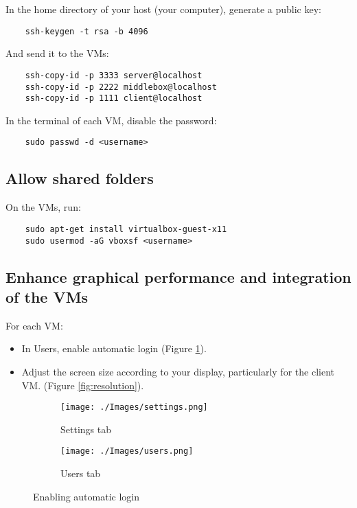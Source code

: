 \documentclass[11pt]{article}
\begin{document}
In the home directory of your host (your computer), generate a public key:
\begin{verbatim}
    ssh-keygen -t rsa -b 4096
\end{verbatim}

And send it to the VMs:
\begin{verbatim}
    ssh-copy-id -p 3333 server@localhost
    ssh-copy-id -p 2222 middlebox@localhost
    ssh-copy-id -p 1111 client@localhost
\end{verbatim}

In the terminal of each VM, disable the password:
\begin{verbatim}
    sudo passwd -d <username>
\end{verbatim}


\subsection{Allow shared folders}
\label{sec:org49c0a3b}

On the VMs, run:
\begin{verbatim}
    sudo apt-get install virtualbox-guest-x11
    sudo usermod -aG vboxsf <username>
\end{verbatim}


\subsection{Enhance graphical performance and integration of the VMs}
\label{sec:org22a38f4}



For each VM:
\begin{itemize}
    \item In Users, enable automatic login (Figure \ref{fig:settings}).
    \item Adjust the screen size according to your display, particularly for the client VM. (Figure \ref{fig:resolution}).
\end{itemize}

\begin{figure}[H]
    \centering
    
    \begin{subfigure}{.4\textwidth}
        \texttt{[image: ./Images/settings.png]}
        \caption{Settings tab}
    \end{subfigure}
    \hfill
    \begin{subfigure}{.4\textwidth}
        \texttt{[image: ./Images/users.png]}
        \caption{Users tab}
    \end{subfigure}
    \caption{Enabling automatic login}
    \label{fig:settings}
\end{figure}
\end{document}
